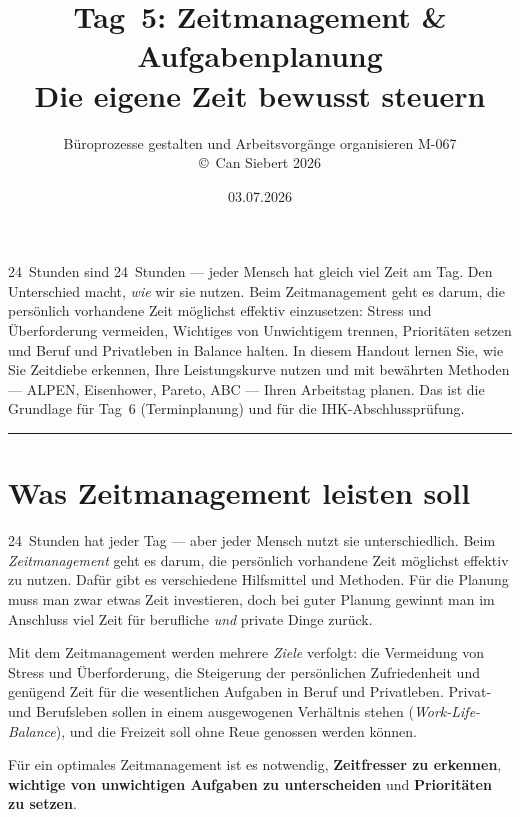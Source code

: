 \documentclass[11pt, a4paper]{article}
\title{\vspace*{-1.5cm}\Huge\bfseries\color{bfwPrimaryDark}Tag~5: Zeitmanagement \& Aufgabenplanung\\[0.4em]
  \large\color{bfwInkSoft}\textnormal{Die eigene Zeit bewusst steuern}}
\author{\textsf{Büroprozesse gestalten und Arbeitsvorgänge organisieren \textperiodcentered{} M-067}\\
\textsf{\small\copyright\ Can Siebert\,\textperiodcentered\,2026}}
\date{03.07.2026}
\begin{document}
\maketitle
\thispagestyle{empty}

\vspace{1em}
\begin{merksatz}[title={\bfseries Worum geht es heute?}]
24~Stunden sind 24~Stunden --- jeder Mensch hat gleich viel Zeit am Tag. Den Unterschied
macht, \emph{wie} wir sie nutzen. Beim Zeitmanagement geht es darum, die persönlich
vorhandene Zeit möglichst effektiv einzusetzen: Stress und Überforderung vermeiden,
Wichtiges von Unwichtigem trennen, Prioritäten setzen und Beruf und Privatleben in
Balance halten. In diesem Handout lernen Sie, wie Sie Zeitdiebe erkennen, Ihre
Leistungskurve nutzen und mit bewährten Methoden --- ALPEN, Eisenhower, Pareto, ABC ---
Ihren Arbeitstag planen. Das ist die Grundlage für Tag~6 (Terminplanung) und für die
IHK-Abschlussprüfung.
\end{merksatz}

\tableofcontents
\vspace{1em}
\hrule
\vspace{1em}

\section{Was Zeitmanagement leisten soll}

24~Stunden hat jeder Tag --- aber jeder Mensch nutzt sie unterschiedlich. Beim
\emph{Zeitmanagement} geht es darum, die persönlich vorhandene Zeit möglichst effektiv
zu nutzen. Dafür gibt es verschiedene Hilfsmittel und Methoden. Für die Planung muss man
zwar etwas Zeit investieren, doch bei guter Planung gewinnt man im Anschluss viel Zeit
für berufliche \emph{und} private Dinge zurück.

Mit dem Zeitmanagement werden mehrere \emph{Ziele} verfolgt: die Vermeidung von Stress
und Überforderung, die Steigerung der persönlichen Zufriedenheit und genügend Zeit für
die wesentlichen Aufgaben in Beruf und Privatleben. Privat- und Berufsleben sollen in
einem ausgewogenen Verhältnis stehen (\emph{Work-Life-Balance}), und die Freizeit soll
ohne Reue genossen werden können.

\begin{merksatz}
Für ein optimales Zeitmanagement ist es notwendig, \textbf{Zeitfresser zu erkennen},
\textbf{wichtige von unwichtigen Aufgaben zu unterscheiden} und \textbf{Prioritäten zu
setzen}.
\end{merksatz}
\end{document}
